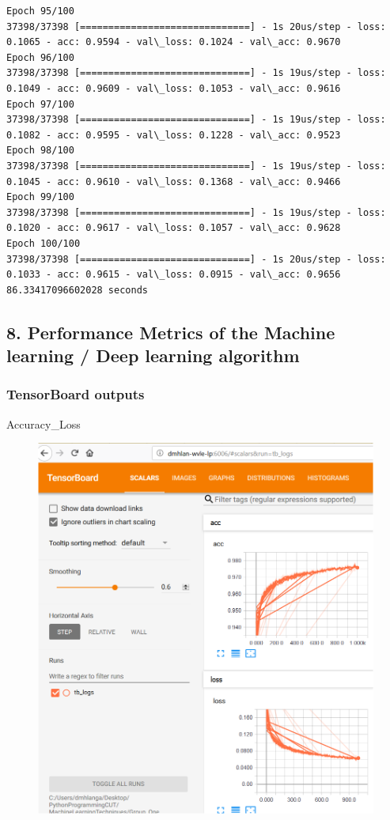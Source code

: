 \documentclass[11pt]{article}
\makeatletter
\def\maxwidth{\ifdim\Gin@nat@width>\linewidth\linewidth
    \else\Gin@nat@width\fi}
\let\Oldincludegraphics\includegraphics
\renewcommand{\includegraphics}[1]{\Oldincludegraphics[width=.8\maxwidth]{#1}}
\makeatother
\begin{document}
\begin{Verbatim}[commandchars=\\\{\}]
Epoch 95/100
37398/37398 [==============================] - 1s 20us/step - loss: 0.1065 - acc: 0.9594 - val\_loss: 0.1024 - val\_acc: 0.9670
Epoch 96/100
37398/37398 [==============================] - 1s 19us/step - loss: 0.1049 - acc: 0.9609 - val\_loss: 0.1053 - val\_acc: 0.9616
Epoch 97/100
37398/37398 [==============================] - 1s 19us/step - loss: 0.1082 - acc: 0.9595 - val\_loss: 0.1228 - val\_acc: 0.9523
Epoch 98/100
37398/37398 [==============================] - 1s 19us/step - loss: 0.1045 - acc: 0.9610 - val\_loss: 0.1368 - val\_acc: 0.9466
Epoch 99/100
37398/37398 [==============================] - 1s 19us/step - loss: 0.1020 - acc: 0.9617 - val\_loss: 0.1057 - val\_acc: 0.9628
Epoch 100/100
37398/37398 [==============================] - 1s 20us/step - loss: 0.1033 - acc: 0.9615 - val\_loss: 0.0915 - val\_acc: 0.9656
86.33417096602028 seconds

    \end{Verbatim}

    \subsection{8. Performance Metrics of the Machine learning / Deep
learning
algorithm}\label{performance-metrics-of-the-machine-learning-deep-learning-algorithm}

    \subsubsection{TensorBoard outputs}\label{tensorboard-outputs}

Accuracy\_Loss

\begin{figure}
\centering
\includegraphics{accuracy_loss.png}
\caption{}
\end{figure}
\end{document}
